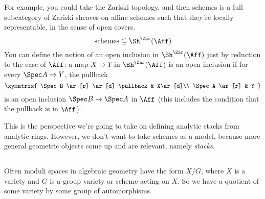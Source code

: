 For example, you could take the Zariski topology, and then schemes is a full subcategory of Zariski sheaves on affine schemes such that they're locally representable, in the sense of open covers.
\[
  \text{schemes} \subseteq \Sh^\Zar(\Aff)
\]
You can define the notion of an open inclusion in $\Sh^\Zar(\Aff)$ just by reduction to the case of $\Aff$: a map $X\to Y$ in $\Sh^\Zar(\Aff)$ is an open inclusion if for every $\Spec A\to Y$, the pullback
\[\xymatrix{
  \Spec B \ar[r] \ar[d] \pullback & X\ar[d]\\
  \Spec A \ar[r] & Y
}\]
is an open inclusion $\Spec B\to \Spec A$ in $\Aff$ (this includes the condition that the pullback is in $\Aff$).

This is the perspective we're going to take on defining analytic stacks from analytic rings. However, we don't want to take schemes as a model, because more general geometric objects come up and are relevant, namely \emph{stacks}.

\subsection{}
Often moduli spaces in algebraic geometry have the form $X/G$, where $X$ is a variety and $G$ is a group variety or scheme acting on $X$. So we have a quotient of some variety by some group of automorphisms.

